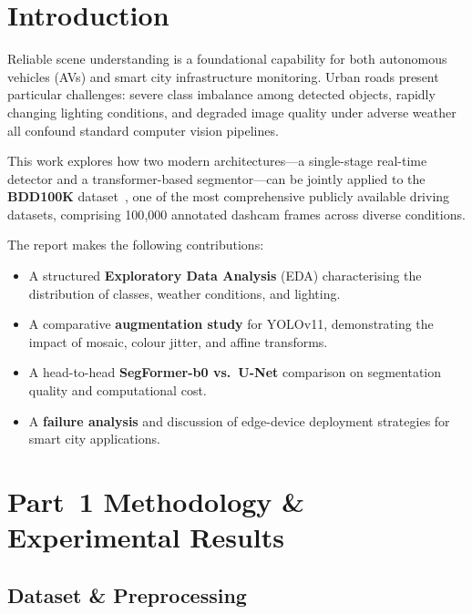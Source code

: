 \documentclass[10pt,twocolumn]{article}
\begin{document}
\section{Introduction}
\label{sec:intro}

Reliable scene understanding is a foundational capability for both autonomous
vehicles (AVs) and smart city infrastructure monitoring.  Urban roads present
particular challenges: severe class imbalance among detected objects, rapidly
changing lighting conditions, and degraded image quality under adverse weather
all confound standard computer vision pipelines.

This work explores how two modern architectures---a single-stage real-time
detector and a transformer-based segmentor---can be jointly applied to the
\textbf{BDD100K} dataset~\cite{yu2020bdd100k}, one of the most comprehensive
publicly available driving datasets, comprising 100{,}000 annotated dashcam
frames across diverse conditions.

The report makes the following contributions:
\begin{itemize}
  \item A structured \textbf{Exploratory Data Analysis} (EDA) characterising
        the distribution of classes, weather conditions, and lighting.
  \item A comparative \textbf{augmentation study} for YOLOv11, demonstrating
        the impact of mosaic, colour jitter, and affine transforms.
  \item A head-to-head \textbf{SegFormer-b0 vs.\ U-Net} comparison on
        segmentation quality and computational cost.
  \item A \textbf{failure analysis} and discussion of edge-device deployment
        strategies for smart city applications.
\end{itemize}

\section{Part~1 Methodology \& Experimental Results}
\label{sec:method}

\subsection{Dataset \& Preprocessing}
\end{document}

